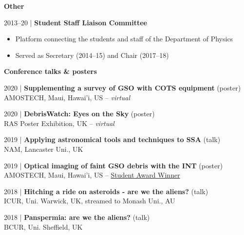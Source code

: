 \documentclass[10pt,a4paper]{altacv}
\begin{document}
\divider

\normalsize \textbf{Other}

\medskip

\small 2013--20 | \textbf{Student Staff Liaison Committee} \\
\smallskip
\begin{itemize}
	\item Platform connecting the students and staff of the Department of Physics
	\item Served as Secretary (2014--15) and Chair (2017--18)
\end{itemize}

\medskip




\normalsize \textbf{Conference talks \& posters}

\medskip

\small 2020 | \textbf{Supplementing a survey of GSO with COTS equipment} (poster) \\
AMOSTECH, Maui, Hawai'i, US -- \textit{virtual}

\smallskip

\small 2020 | \textbf{DebrisWatch: Eyes on the Sky} (poster) \\
RAS Poster Exhibition, UK -- \textit{virtual}

\smallskip

\small 2019 | \textbf{Applying astronomical tools and techniques to SSA} (talk) \\
NAM, Lancaster Uni., UK

\smallskip

\small 2019 | \textbf{Optical imaging of faint GSO debris with the INT} (poster) \\
AMOSTECH, Maui, Hawai'i, US -- \href{https://amostech.com/2019-archive/}{Student Award Winner}

\smallskip

\small 2018 | \textbf{Hitching a ride on asteroids - are we the aliens?} (talk) \\
ICUR, Uni. Warwick, UK, streamed to Monash Uni., AU

\smallskip

\small 2018 | \textbf{Panspermia: are we the aliens?} (talk) \\
BCUR, Uni. Sheffield, UK

\smallskip
\end{document}
